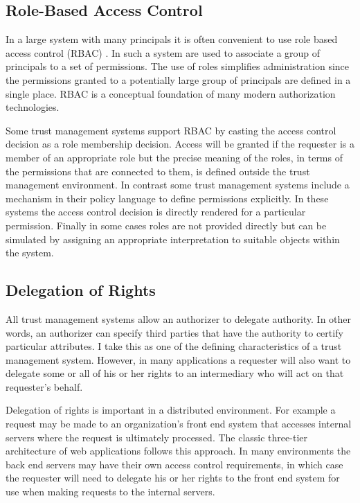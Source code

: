 \subsection{Role-Based Access Control}

In a large system with many principals it is often convenient to use role based access control
(RBAC) \cite{Ferraiolo:RBAC,Sandhu:RBACM}. In such a system  are used to
associate a group of principals to a set of permissions. The use of roles simplifies
administration since the permissions granted to a potentially large group of principals are
defined in a single place. RBAC is a conceptual foundation of many modern authorization
technologies.

Some trust management systems support RBAC by casting the access control decision as a role
membership decision. Access will be granted if the requester is a member of an appropriate role
but the precise meaning of the roles, in terms of the permissions that are connected to them, is
defined outside the trust management environment. In contrast some trust management systems
include a mechanism in their policy language to define permissions explicitly. In these systems
the access control decision is directly rendered for a particular permission. Finally in some
cases roles are not provided directly but can be simulated by assigning an appropriate
interpretation to suitable objects within the system.

\subsection{Delegation of Rights}

All trust management systems allow an authorizer to delegate authority. In other words, an
authorizer can specify third parties that have the authority to certify particular attributes. I
take this as one of the defining characteristics of a trust management system. However, in many
applications a requester will also want to delegate some or all of his or her rights to an
intermediary who will act on that requester's behalf.

Delegation of rights is important in a distributed environment. For example a request may be
made to an organization's front end system that accesses internal servers where the request is
ultimately processed. The classic three-tier architecture of web applications follows this
approach. In many environments the back end servers may have their own access control
requirements, in which case the requester will need to delegate his or her rights to the front
end system for use when making requests to the internal servers.


